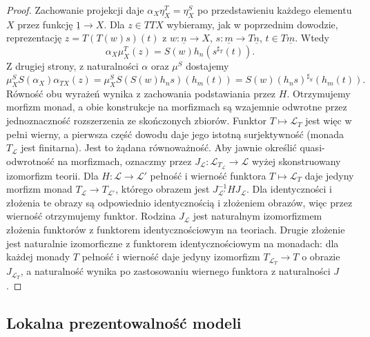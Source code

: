 \begin{proof}
Zachowanie projekcji daje $\alpha_X\eta_X^T=\eta_X^S$ po przedstawieniu każdego elementu $X$ przez funkcję $\underline 1\to X$. Dla $z\in TTX$ wybieramy, jak w poprzednim dowodzie, reprezentację $z=T(T(w)s)(t)$ z $w:\underline n\to X$, $s:\underline m\to T\underline n$, $t\in T\underline m$. Wtedy
\[
 \alpha_X\mu^T_X(z)=S(w)h_n(s^{\sharp_T}(t)).
\]
Z drugiej strony, z naturalności $\alpha$ oraz $\mu^S$ dostajemy
\[
 \mu_X^S S(\alpha_X)\alpha_{TX}(z)
 =\mu_X^S S(S(w)h_n s)(h_m(t))
 =S(w)(h_n s)^{\sharp_S}(h_m(t)).
\]
Równość obu wyrażeń wynika z zachowania podstawiania przez $H$. Otrzymujemy morfizm monad, a obie konstrukcje na morfizmach są wzajemnie odwrotne przez jednoznaczność rozszerzenia ze skończonych zbiorów. Funktor $T\mapsto\mathcal L_T$ jest więc w pełni wierny, a pierwsza część dowodu daje jego istotną surjektywność (monada $T_{\mathcal L}$ jest finitarna). Jest to żądana równoważność. Aby jawnie określić quasi-odwrotność na morfizmach, oznaczmy przez $J_{\mathcal L}:\mathcal L_{T_{\mathcal L}}\to\mathcal L$ wyżej skonstruowany izomorfizm teorii. Dla $H:\mathcal L\to\mathcal L'$ pełność i wierność funktora $T\mapsto\mathcal L_T$ daje jedyny morfizm monad $T_{\mathcal L}\to T_{\mathcal L'}$, którego obrazem jest $J_{\mathcal L'}^{-1}HJ_{\mathcal L}$. Dla identyczności i złożenia te obrazy są odpowiednio identycznością i złożeniem obrazów, więc przez wierność otrzymujemy funktor. Rodzina $J_{\mathcal L}$ jest naturalnym izomorfizmem złożenia funktorów z funktorem identycznościowym na teoriach. Drugie złożenie jest naturalnie izomorficzne z funktorem identycznościowym na monadach: dla każdej monady $T$ pełność i wierność daje jedyny izomorfizm $T_{\mathcal L_T}\to T$ o obrazie $J_{\mathcal L_T}$, a naturalność wynika po zastosowaniu wiernego funktora z naturalności $J$.
\end{proof}

\subsection{Lokalna prezentowalność modeli}

